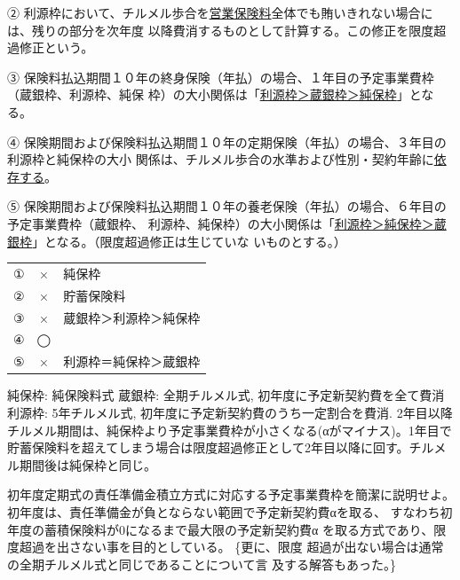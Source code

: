 \documentclass[report,gutter=10mm,fore-edge=10mm,uplatex,dvipdfmx]{jlreq}
\begin{document}
② 利源枠において、チルメル歩合を\underline{営業保険料}全体でも賄いきれない場合には、残りの部分を次年度
以降費消するものとして計算する。この修正を限度超過修正という。

③ 保険料払込期間１０年の終身保険（年払）の場合、１年目の予定事業費枠（蔵銀枠、利源枠、純保
枠）の大小関係は「\underline{利源枠＞蔵銀枠＞純保枠}」となる。

④ 保険期間および保険料払込期間１０年の定期保険（年払）の場合、３年目の利源枠と純保枠の大小
関係は、チルメル歩合の水準および性別・契約年齢に\underline{依存する}。

⑤ 保険期間および保険料払込期間１０年の養老保険（年払）の場合、６年目の予定事業費枠（蔵銀枠、
利源枠、純保枠）の大小関係は「\underline{利源枠＞純保枠＞蔵銀枠}」となる。（限度超過修正は生じていな
いものとする。）
\answer{}
\begin{tabular}{ccl}
 ①& ×& 純保枠\\
 ②& ×& 貯蓄保険料\\
 ③& ×& 蔵銀枠＞利源枠＞純保枠\\
 ④&◯ &\\
 ⑤& ×& 利源枠＝純保枠＞蔵銀枠\\
\end{tabular}

純保枠: 純保険料式
蔵銀枠: 全期チルメル式, 初年度に予定新契約費を全て費消
利源枠: 5年チルメル式, 初年度に予定新契約費のうち一定割合を費消. 2年目以降チルメル期間は、純保枠より予定事業費枠が小さくなる(αがマイナス)。1年目で貯蓄保険料を超えてしまう場合は限度超過修正として2年目以降に回す。チルメル期間後は純保枠と同じ。

初年度定期式の責任準備金積立方式に対応する予定事業費枠を簡潔に説明せよ。
\answer{}
初年度は、責任準備金が負とならない範囲で予定新契約費αを取る、
すなわち初年度の蓄積保険料が0になるまで最大限の予定新契約費α
を取る方式であり、限度超過を出さない事を目的としている。
\{更に、限度
超過が出ない場合は通常の全期チルメル式と同じであることについて言
及する解答もあった。\}
\end{document}
